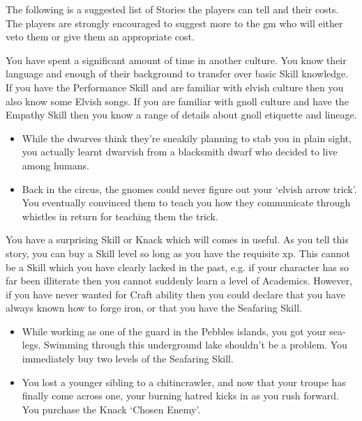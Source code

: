 \begin{multicols}{2}

\noindent
The following is a suggested list of Stories the players can tell and their costs.
The players are strongly encouraged to suggest more to the \gls{gm} who will either veto them or give them an appropriate cost.

You have spent a significant amount of time in another culture. You know their language and enough of their background to transfer over basic Skill knowledge. If you have the Performance Skill and are familiar with elvish culture then you also know some Elvish songs.
If you are familiar with gnoll culture and have the Empathy Skill then you know a range of details about gnoll etiquette and lineage.

\begin{itemize}
\item While the dwarves think they're sneakily planning to stab you in plain sight, you actually learnt dwarvish from a blacksmith dwarf who decided to live among humans.
\item Back in the circus, the gnomes could never figure out your `elvish arrow trick'.
You eventually convinced them to teach you how they communicate through whistles in return for teaching them the trick.
\end{itemize}

\label{surpriseSkill}
You have a surprising Skill or Knack which will comes in useful.
As you tell this story, you can buy a Skill level so long as you have the requisite \gls{xp}.
This cannot be a Skill which you have clearly lacked in the past, e.g. if your character has so far been illiterate then you cannot suddenly learn a level of Academics.
However, if you have never wanted for Craft ability then you could declare that you have always known how to forge iron, or that you have the Seafaring Skill.

\begin{itemize}
\item

While working as one of the \gls{guard} in the Pebbles islands, you got your sea-legs.
Swimming through this underground lake shouldn't be a problem.
You immediately buy two levels of the Seafaring Skill.
\item
You lost a younger sibling to a chitincrawler, and now that your troupe has finally come across one, your burning hatred kicks in as you rush forward.
You purchase the Knack `Chosen Enemy'.


\end{itemize}
\end{multicols}
